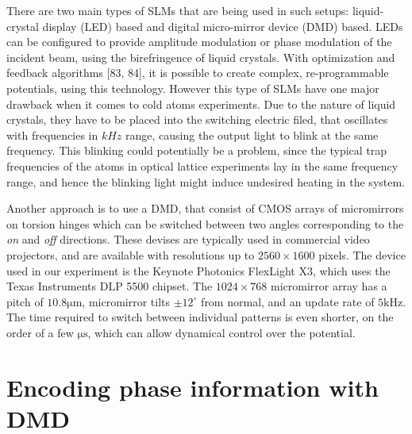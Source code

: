 There are two main types of SLMs that are being used in such setups: liquid-crystal display (LED) based and digital micro-mirror device (DMD) based. LEDs can be configured to provide amplitude modulation or phase modulation of the incident beam, using the birefringence of liquid crystals. With optimization and feedback algorithms [83, 84], it is possible to create complex, re-programmable potentials, using this technology. However this type of SLMs have one major drawback when it comes to cold atoms experiments. Due to the nature of liquid crystals, they have to be placed into the switching electric filed, that oscillates with frequencies in $kHz$ range, causing the output light to blink at the same frequency. This blinking could potentially be a problem, since the typical trap frequencies of the atoms in optical lattice experiments lay in the same frequency range, and hence the blinking light might induce undesired heating in the system.

Another approach is to use a DMD, that consist of CMOS arrays of micromirrors on torsion hinges which can be switched
between two angles corresponding to the \textit{on} and \textit{off} directions. These devises are typically used in commercial video projectors, and are available with resolutions up to $2560 \times 1600$ pixels. The device used in our experiment is the Keynote Photonics FlexLight X3, which uses the Texas Instruments DLP 5500 chipset. The $1024 \times 768$ micromirror array has a pitch of $10.8 \mathrm{\mu m}$, micromirror tilts $\pm 12^{\circ}$ from normal, and an update rate of $5 \mathrm{kHz}$. The time required to switch between individual patterns is even shorter, on the order of a few $\mathrm{\mu s}$, which can allow dynamical control over the potential.

\section{Encoding phase information with DMD}

